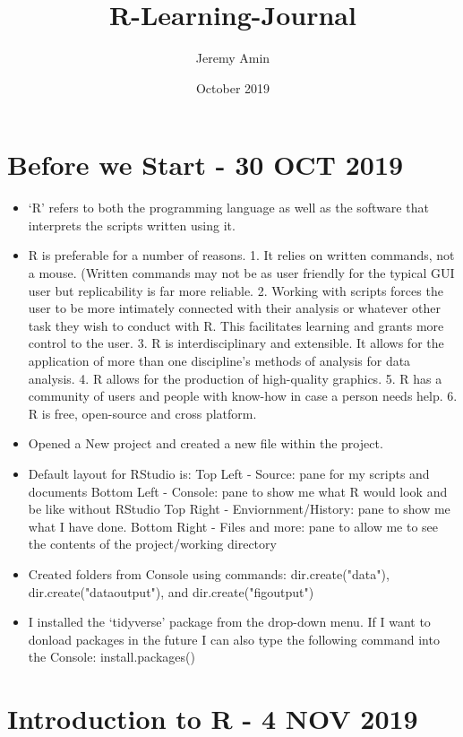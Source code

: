 \documentclass{article}
\title{R-Learning-Journal}
\author{Jeremy Amin}
\date{October 2019}
\begin{document}
\maketitle

\section{Before we Start - 30 OCT 2019}

\begin{itemize}
    \item `R' refers to both the programming language as well as the software that interprets the scripts written using it.
    \item R is preferable for a number of reasons. 1. It relies on written commands, not a mouse. (Written commands may not be as user friendly for the typical GUI user but replicability is far more reliable. 2. Working with scripts forces the user to be more intimately connected with their analysis or whatever other task they wish to conduct with R. This facilitates learning and grants more control to the user. 3. R is interdisciplinary and extensible. It allows for the application of more than one discipline's methods of analysis for data analysis. 4. R allows for the production of high-quality graphics. 5. R has a community of users and people with know-how in case a person needs help. 6. R is free, open-source and cross platform.
    \item Opened a New project and created a new file within the project.
    \item Default layout for RStudio is: Top Left - Source: pane for my scripts and documents
Bottom Left - Console: pane to show me what R would look and be like without RStudio
Top Right - Enviornment/History: pane to show me what I have done.
Bottom Right - Files and more: pane to allow me to see the contents of the project/working directory
\item Created folders from Console using commands: dir.create("data"),
dir.create("data\textunderscore output"), and
dir.create("fig\textunderscore output")
\item I installed the `tidyverse' package from the drop-down menu. If I want to donload packages in the future I can also type the following command into the Console: install.packages()

\end{itemize}

\section{Introduction to R - 4 NOV 2019}
\end{document}
